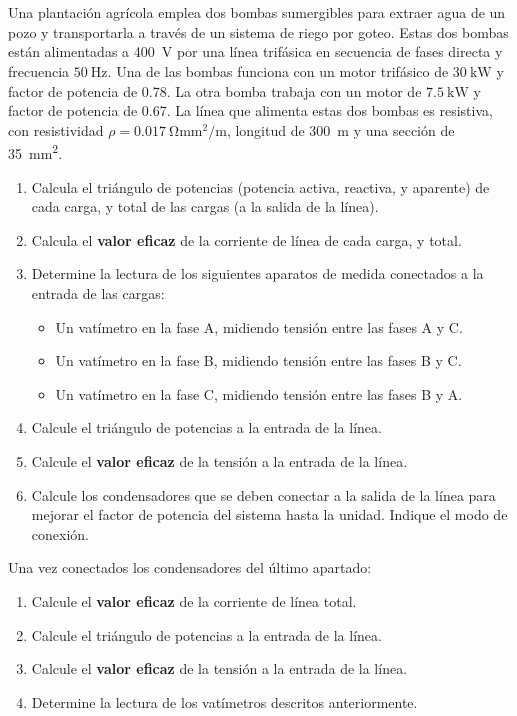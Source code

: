\documentclass[12pt]{article}
\begin{document}
 \clearpage
 
 \section{}

 Una plantación agrícola emplea dos bombas sumergibles para extraer
 agua de un pozo y transportarla a través de un sistema de riego por
 goteo. Estas dos bombas están alimentadas a \SI{400}{\volt} por una
 línea trifásica en secuencia de fases directa y frecuencia
 $\SI{50}{\hertz}$. Una de las bombas funciona con un motor trifásico
 de $\SI{30}{\kilo\watt}$ y factor de potencia de 0.78. La otra bomba
 trabaja con un motor de $\SI{7.5}{\kilo\watt}$ y factor de potencia
 de 0.67.  La línea que alimenta estas dos bombas es resistiva, con
 resistividad $\rho = \SI{0.017}{\ohm\milli\meter\squared\per\meter}$,
 longitud de \SI{300}{m} y una sección de
 \SI{35}{\milli\meter\squared}.
 
 \begin{enumerate}
 \item Calcula el triángulo de potencias (potencia activa, reactiva, y
   aparente) de cada carga, y total de las cargas (a la salida de la
   línea).
 \item Calcula el \textbf{valor eficaz} de la corriente de línea de
   cada carga, y total.
 \item Determine la lectura de los siguientes aparatos de medida
   conectados a la entrada de las cargas:
   \begin{itemize}
   \item Un vatímetro en la fase A, midiendo tensión entre las fases A
     y C.
   \item Un vatímetro en la fase B, midiendo tensión entre las fases B
     y C.
   \item Un vatímetro en la fase C, midiendo tensión entre las fases B
     y A.
   \end{itemize}
 \item Calcule el triángulo de potencias a la entrada de la línea.
 \item Calcule el \textbf{valor eficaz} de la tensión a la entrada de la línea.
 \item Calcule los condensadores que se deben conectar a la salida de
   la línea para mejorar el factor de potencia del sistema hasta la
   unidad. Indique el modo de conexión.
 \end{enumerate}

Una vez conectados los condensadores del último apartado:
\begin{enumerate}[resume]
\item Calcule el \textbf{valor eficaz} de la corriente de línea total.
\item Calcule el triángulo de potencias a la entrada de la línea.
\item Calcule el \textbf{valor eficaz} de la tensión a la entrada de la línea.
\item Determine la lectura de los vatímetros descritos anteriormente.
\end{enumerate}
\end{document}
